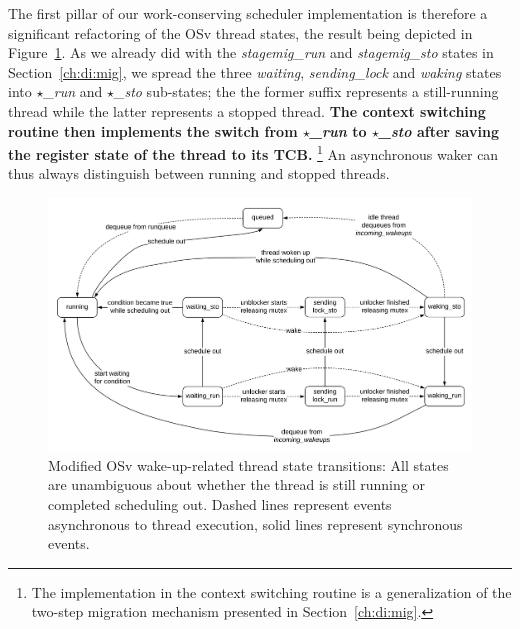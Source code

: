 \documentclass[12pt,a4paper]{book}
\begin{document}
The first pillar of our work-conserving scheduler implementation is therefore a significant refactoring of the OSv thread states, the result being depicted in Figure~\ref{fig:di:wake:spreadstates}.
As we already did with the \textit{stagemig\_run} and \textit{stagemig\_sto} states in Section~\ref{ch:di:mig},
we spread the three \textit{waiting}, \textit{sending\_lock} and \textit{waking} states into \textit{$\star$\_run} and \textit{$\star$\_sto} sub-states; the the former suffix represents a still-running thread while the latter represents a stopped thread.
\textbf{The context switching routine then implements the switch from \textit{$\star$\_run} to \textit{$\star$\_sto} after saving the register state of the thread to its TCB.}%
\footnote{The implementation in the context switching routine is a generalization of the two-step migration mechanism presented in Section~\ref{ch:di:mig}.}
An asynchronous waker can thus always distinguish between running and stopped threads.

\begin{figure}
    \centering
    \includegraphics[width=\textwidth]{fig_build/state_chart_post_spread}
    \caption{Modified OSv wake-up-related thread state transitions: All states are unambiguous about whether the thread is still running or completed scheduling out.
        Dashed lines represent events asynchronous to thread execution, solid lines represent synchronous events.
    }
    \label{fig:di:wake:spreadstates}
\end{figure}
\end{document}
